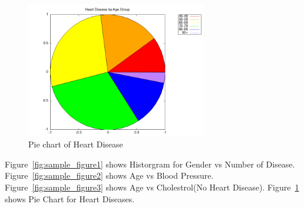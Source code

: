 \documentclass{article}
\begin{document}
\begin{figure}[H]
\centering
\includegraphics[width=0.7\textwidth]{4d.png}
\caption{Pie chart of Heart Disease}
\label{fig:sample_figure4}
\end{figure}
Figure~\ref{fig:sample_figure1} shows Historgram for Gender vs Number of Disease. Figure~\ref{fig:sample_figure2} shows Age vs Blood Pressure. Figure~\ref{fig:sample_figure3} shows Age vs Cholestrol(No Heart Disease). Figure~\ref{fig:sample_figure4} shows Pie Chart for Heart Diseases.
\end{document}
